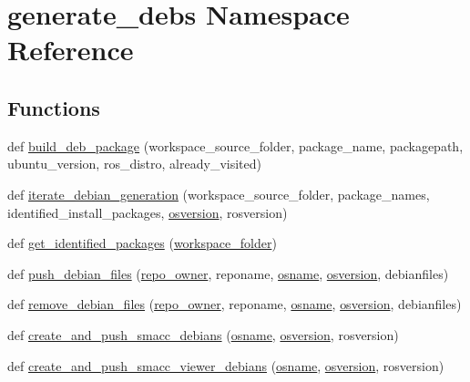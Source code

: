 \hypertarget{namespacegenerate__debs}{}\section{generate\+\_\+debs Namespace Reference}
\label{namespacegenerate__debs}
\subsection*{Functions}
\begin{DoxyCompactItemize}
\item 
def \hyperlink{namespacegenerate__debs_aa70c3f4917ddc57b13eaed8501f571a8}{build\+\_\+deb\+\_\+package} (workspace\+\_\+source\+\_\+folder, package\+\_\+name, packagepath, ubuntu\+\_\+version, ros\+\_\+distro, already\+\_\+visited)
\item 
def \hyperlink{namespacegenerate__debs_a2615a6fc7860b6aa9e920e6b4d886589}{iterate\+\_\+debian\+\_\+generation} (workspace\+\_\+source\+\_\+folder, package\+\_\+names, identified\+\_\+install\+\_\+packages, \hyperlink{namespacegenerate__debs_afd02fe6ead63bc5db5d3c3b9eb973b62}{osversion}, rosversion)
\item 
def \hyperlink{namespacegenerate__debs_aa91b87c6d9c3ed04015845cc9298431a}{get\+\_\+identified\+\_\+packages} (\hyperlink{namespacegenerate__debs_acb69863b90257249a30e43ebacfb8bd8}{workspace\+\_\+folder})
\item 
def \hyperlink{namespacegenerate__debs_a9b22f5ad65b40b7903c467eda308e575}{push\+\_\+debian\+\_\+files} (\hyperlink{namespacegenerate__debs_a23479dba5af50c90f3346b04d441ab2b}{repo\+\_\+owner}, reponame, \hyperlink{namespacegenerate__debs_ad06322332de29cb27a40152d0cccc2ca}{osname}, \hyperlink{namespacegenerate__debs_afd02fe6ead63bc5db5d3c3b9eb973b62}{osversion}, debianfiles)
\item 
def \hyperlink{namespacegenerate__debs_a08095040d038b3613ad0e77fd4e7f60e}{remove\+\_\+debian\+\_\+files} (\hyperlink{namespacegenerate__debs_a23479dba5af50c90f3346b04d441ab2b}{repo\+\_\+owner}, reponame, \hyperlink{namespacegenerate__debs_ad06322332de29cb27a40152d0cccc2ca}{osname}, \hyperlink{namespacegenerate__debs_afd02fe6ead63bc5db5d3c3b9eb973b62}{osversion}, debianfiles)
\item 
def \hyperlink{namespacegenerate__debs_af7237c463c8e5b4df369e6befc154c50}{create\+\_\+and\+\_\+push\+\_\+smacc\+\_\+debians} (\hyperlink{namespacegenerate__debs_ad06322332de29cb27a40152d0cccc2ca}{osname}, \hyperlink{namespacegenerate__debs_afd02fe6ead63bc5db5d3c3b9eb973b62}{osversion}, rosversion)
\item 
def \hyperlink{namespacegenerate__debs_a9a6167ed98fbdc7b1e1c56da5652cf19}{create\+\_\+and\+\_\+push\+\_\+smacc\+\_\+viewer\+\_\+debians} (\hyperlink{namespacegenerate__debs_ad06322332de29cb27a40152d0cccc2ca}{osname}, \hyperlink{namespacegenerate__debs_afd02fe6ead63bc5db5d3c3b9eb973b62}{osversion}, rosversion)
\end{DoxyCompactItemize}

